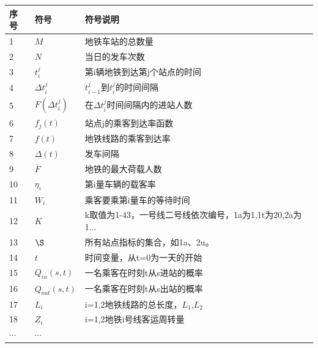 \documentclass[12pt,a4paper]{mcmthesis}
\newcommand{\headcol}{\rowcolor{tableheadcolor}}
\begin{document}
    \begin{table}[h!]
        \centering
        \small
        \begin{tabular}{p{60pt}<{\centering}|p{60pt}<{\centering}p{180pt}<{\raggedright}}
            \hline
            \headcol 序号 & 符号                  & 符号说明                                   \\
            \hline
            1           & $M$                 & 地铁车站的总数量                               \\
            2           & $N$                 & 当日的发车次数                                \\
            3           & $t_{i}^{j}$         & 第i辆地铁到达第j个站点的时间                        \\
            4           & $\Delta {t_i^j}$    & $t_{i-1}^{j}$到$t_i^j$的时间间隔             \\
            5           & $F(\Delta {t_i^j})$ & 在$\Delta t_i^j$时间间隔内的进站人数              \\
            6           & $f_j(t)$            & 站点j的乘客到达率函数                            \\
            7           & ${f(t)}$            & 地铁线路的乘客到达率                             \\
            8           & $\Delta(t)$         & 发车间隔                                   \\
            9           & $\overline{F}$      & 地铁的最大荷载人数                              \\
            10          & $\eta_i$            & 第i量车辆的载客率                              \\
            11          & $W_i$               & 乘客要乘第i量车的等待时间                          \\
            12          & $K$                 & k取值为1-43，一号线二号线依次编号，1a为1,1t为20,2a为1... \\
            13          & $\S$                & 所有站点指标的集合，如1a、2u。                      \\
            14          & $t$                 & 时间变量，从t=0为一天的开始                        \\
            15          & $Q_{in}(s,t)$       & 一名乘客在时刻t从s进站的概率                        \\
            16          & $Q_{out}(s,t)$      & 一名乘客在时刻t从s出站的概率                        \\
            17          & $L_i$               & i={1,2}地铁线路的总长度，$L_1$,$L_2$            \\
            18          & $Z_i$               & i={1,2}地铁i号线客运周转量                      \\
            $\cdots$ & $\cdots$ \\
            \hline
        \end{tabular}
        \label{symbol}
    \end{table}
\end{document}
